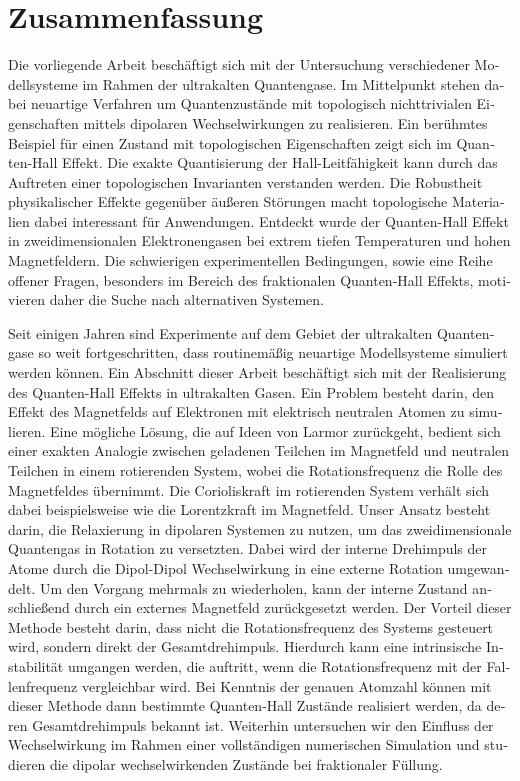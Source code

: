 \chapter*{Zusammenfassung}

\begin{otherlanguage}{ngerman}

Die vorliegende Arbeit beschäftigt sich mit der Untersuchung verschiedener
Modellsysteme im Rahmen der ultrakalten Quantengase.
Im Mittelpunkt stehen dabei neuartige Verfahren um Quantenzustände mit topologisch nichttrivialen Eigenschaften mittels dipolaren Wechselwirkungen zu realisieren.
Ein berühmtes Beispiel für einen Zustand mit topologischen Eigenschaften zeigt sich im Quanten-Hall Effekt.
Die exakte Quantisierung der Hall-Leitfähigkeit kann durch das Auftreten einer topologischen Invarianten verstanden werden.
Die Robustheit physikalischer Effekte gegenüber äußeren Störungen macht topologische Materialien dabei interessant für Anwendungen.
Entdeckt wurde der Quanten-Hall Effekt in zweidimensionalen Elektronengasen bei extrem tiefen Temperaturen und hohen Magnetfeldern.
Die schwierigen experimentellen Bedingungen, sowie eine Reihe offener Fragen, besonders im Bereich des fraktionalen Quanten-Hall Effekts, motivieren daher die Suche nach alternativen Systemen.

Seit einigen Jahren sind Experimente auf dem Gebiet der ultrakalten Quantengase so weit fortgeschritten, dass routinemäßig neuartige Modellsysteme simuliert werden können.
Ein Abschnitt dieser Arbeit beschäftigt sich mit der Realisierung des Quanten-Hall Effekts in ultrakalten Gasen.
Ein Problem besteht darin, den Effekt des Magnetfelds auf Elektronen mit elektrisch neutralen Atomen zu simulieren.
Eine mögliche Lösung, die auf Ideen von Larmor zurückgeht, bedient sich einer exakten Analogie zwischen geladenen Teilchen im Magnetfeld und neutralen Teilchen in einem rotierenden System, wobei die Rotationsfrequenz die Rolle des Magnetfeldes übernimmt.
Die Corioliskraft im rotierenden System verhält sich dabei beispielsweise wie die Lorentzkraft im Magnetfeld.
Unser Ansatz besteht darin, die Relaxierung in dipolaren Systemen zu nutzen, um das zweidimensionale Quantengas in Rotation zu versetzten.
Dabei wird der interne Drehimpuls der Atome durch die Dipol-Dipol Wechselwirkung in eine externe Rotation umgewandelt.
Um den Vorgang mehrmals zu wiederholen, kann der interne Zustand anschließend durch ein externes Magnetfeld zurückgesetzt werden.
Der Vorteil dieser Methode besteht darin, dass nicht die Rotationsfrequenz des Systems gesteuert wird, sondern direkt der Gesamtdrehimpuls.
Hierdurch kann eine intrinsische Instabilität umgangen werden, die auftritt, wenn die Rotationsfrequenz mit der Fallenfrequenz vergleichbar wird.
Bei Kenntnis der genauen Atomzahl können mit dieser Methode dann bestimmte Quanten-Hall Zustände realisiert werden, da deren Gesamtdrehimpuls bekannt ist.
Weiterhin untersuchen wir den Einfluss der Wechselwirkung im Rahmen einer vollständigen numerischen Simulation und studieren die dipolar wechselwirkenden Zustände bei fraktionaler Füllung.


\end{otherlanguage}
